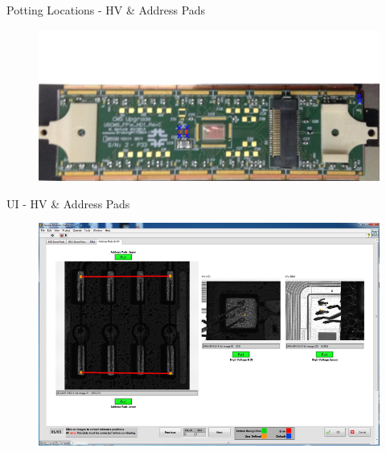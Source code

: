 \documentclass{beamer}
\begin{document}
\begin{frame}{Potting Locations - HV \& Address Pads}
\begin{figure}
    \centering
    \includegraphics[width=\textwidth]{"figures/Module Annotated - Bond Pads HV"}
    \label{fig:module_annotated_bond_pads_hv}
\end{figure}
\end{frame}

\begin{frame}{UI - HV \& Address Pads}
\begin{figure}
    \centering
    \includegraphics[width=\textwidth]{"figures/ui/review_address_HV_pads"}
    \label{fig:review_address_hv_pads}
\end{figure}
\end{frame}
\end{document}
